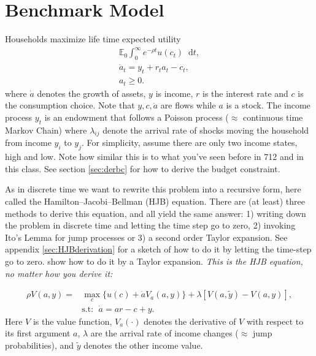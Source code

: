 \documentclass[12pt]{article}
\newcommand{\E}{\mathbb{E}}
\DeclareMathOperator{\1}{\mathbbm{1}}
\newcommand*\diff{\mathop{}\!\mathrm{d}}
\begin{document}
\section{Benchmark Model}
Households maximize life time expected utility
\begin{align}
\E_0 \int_0^\infty e^{-\rho t} u(c_t) \diff t, \\
\dot a_t = y_t + r_t a_t - c_t, \\
a_t\ge 0.
\end{align}
where $\dot a$ denotes the growth of assets, $y$ is income, $r$ is the interest rate and $c$ is the consumption choice. Note that $y,c,\dot a$ are flows while $a$ is a stock. The income process $y_t$ is an endowment that follows a Poisson process ($\approx$ continuous time Markov Chain) where $\lambda_{ij}$ denote the arrival rate of shocks moving the household from income $y_i$ to $y_j$. For simplicity, assume there are only two income states, high and low. Note how similar this is to what you've seen before in 712 and in this class. See section \ref{sec:derbc} for how to derive the budget constraint. 

As in discrete time we want to rewrite this problem into a recursive form, here called the Hamilton–Jacobi–Bellman (HJB) equation. There are (at least) three methods to derive this equation, and all yield the same answer: 1) writing down the problem in discrete time and letting the time step go to zero, 2) invoking Ito's Lemma for jump processes or 3) a second order Taylor expansion. See appendix \ref{sec:HJBderivation} for a sketch of how to do it by letting the time-step go to zero. \cite{Barczyk2017} show how to do it by a Taylor expansion. \textit{This is the HJB equation, no matter how you derive it:}

\begin{align}\label{eq:HJB}
\rho V(a,y) =& \max_{c} \big\{ u(c) + \dot a V_a(a,y) \big\} + \lambda [V(a,\tilde y) - V(a,y)],\\
&\text{s.t: }\; \dot a = a r - c + y.
\end{align}
Here $V$ is the value function, $V_a(\cdot)$ denotes the derivative of $V$ with respect to its first argument $a$, $\lambda$ are the arrival rate of income changes ($\approx$ jump probabilities), and $\tilde y$ denotes the other income value.
\end{document}
